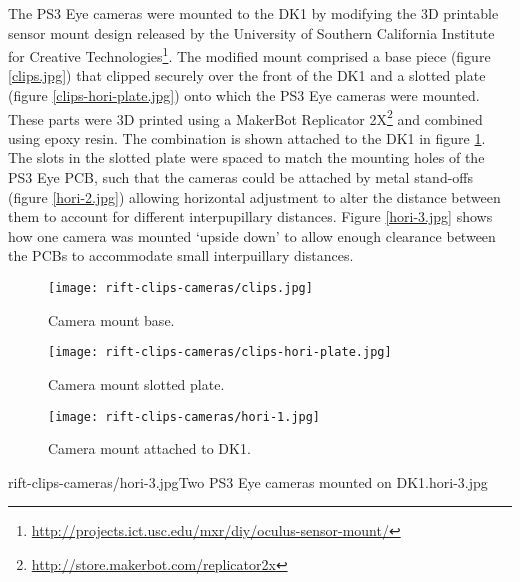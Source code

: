 The PS3 Eye cameras were mounted to the DK1 by modifying the 3D printable sensor mount design released by the University of Southern California Institute for Creative Technologies\footnote{\url{http://projects.ict.usc.edu/mxr/diy/oculus-sensor-mount/}}. The modified mount comprised a base piece (figure \ref{clips.jpg}) that clipped securely over the front of the DK1 and a slotted plate (figure \ref{clips-hori-plate.jpg}) onto which the PS3 Eye cameras were mounted. These parts were 3D printed using a MakerBot Replicator 2X\footnote{\url{http://store.makerbot.com/replicator2x}} and combined using epoxy resin. The combination is shown attached to the DK1 in figure \ref{hori-1.jpg}. The slots in the slotted plate were spaced to match the mounting holes of the PS3 Eye PCB, such that the cameras could be attached by metal stand-offs (figure \ref{hori-2.jpg}) allowing horizontal adjustment to alter the distance between them to account for different interpupillary distances. Figure \ref{hori-3.jpg} shows how one camera was mounted `upside down' to allow enough clearance between the PCBs to accommodate small interpuillary distances.

\begin{figure}[h]
    \centering
    \begin{minipage}{.32\textwidth}
        \centering
        \texttt{[image: rift-clips-cameras/clips.jpg]}
        \caption{Camera mount base.}
        \label{clips.jpg}
    \end{minipage}%
    \hspace{.01\textwidth}
    \begin{minipage}{0.32\textwidth}
        \centering
        \texttt{[image: rift-clips-cameras/clips-hori-plate.jpg]}
        \caption{Camera mount slotted plate.}
        \label{clips-hori-plate.jpg}
    \end{minipage}%
    \hspace{.01\textwidth}
    \begin{minipage}{0.32\textwidth}
        \centering
        \texttt{[image: rift-clips-cameras/hori-1.jpg]}
        \caption{Camera mount attached to DK1.}
        \label{hori-1.jpg}
    \end{minipage}
\end{figure}

       {rift-clips-cameras/hori-3.jpg}{Two PS3 Eye cameras mounted on DK1.}{hori-3.jpg}

